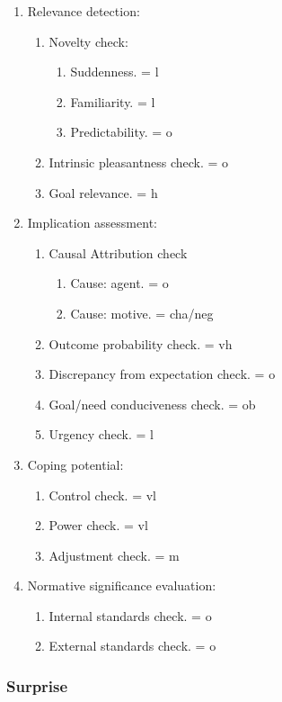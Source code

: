 \begin{enumerate}
 \item  Relevance detection:
 \begin{enumerate}
  \item  Novelty check:
  \begin{enumerate}
   \item  Suddenness. = l
   \item  Familiarity. = l
   \item  Predictability. = o
  \end{enumerate}
  \item  Intrinsic pleasantness check. = o
  \item  Goal relevance. = h
 \end{enumerate}
 \item  Implication assessment:
 \begin{enumerate}
  \item  Causal Attribution check
  \begin{enumerate}
   \item  Cause: agent. = o
   \item  Cause: motive. = cha/neg
  \end{enumerate}
  \item  Outcome probability check. = vh
  \item  Discrepancy from expectation check. = o
  \item  Goal/need conduciveness check. = ob
  \item  Urgency check. = l
 \end{enumerate}
 \item  Coping potential:
 \begin{enumerate}
  \item  Control check. = vl
  \item  Power check. = vl
  \item  Adjustment check. = m
 \end{enumerate}
 \item  Normative significance evaluation:
 \begin{enumerate}
  \item  Internal standards check. = o
  \item  External standards check. = o
 \end{enumerate}
\end{enumerate}

\subsubsection{Surprise}

